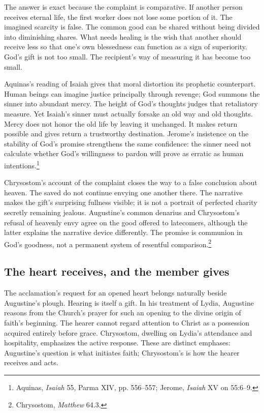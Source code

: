 The answer is exact because the complaint is comparative. If another person receives eternal life, the first worker does not lose some portion of it. The imagined scarcity is false. The common good can be shared without being divided into diminishing shares. What needs healing is the wish that another should receive less so that one's own blessedness can function as a sign of superiority. God's gift is not too small. The recipient's way of measuring it has become too small.

Aquinas's reading of Isaiah gives that moral distortion its prophetic counterpart. Human beings can imagine justice principally through revenge; God summons the sinner into abundant mercy. The height of God's thoughts judges that retaliatory measure. Yet Isaiah's sinner must actually forsake an old way and old thoughts. Mercy does not honor the old life by leaving it unchanged. It makes return possible and gives return a trustworthy destination. Jerome's insistence on the stability of God's promise strengthens the same confidence: the sinner need not calculate whether God's willingness to pardon will prove as erratic as human intentions.\footnote{Aquinas, \textit{Isaiah} 55, Parma XIV, pp. 556--557; Jerome, \textit{Isaiah} XV on 55:6--9.}

Chrysostom's account of the complaint closes the way to a false conclusion about heaven. The saved do not continue envying one another there. The narrative makes the gift's surprising fullness visible; it is not a portrait of perfected charity secretly remaining jealous. Augustine's common denarius and Chrysostom's refusal of heavenly envy agree on the good offered to latecomers, although the latter explains the narrative device differently. The promise is communion in God's goodness, not a permanent system of resentful comparison.\footnote{Chrysostom, \textit{Matthew} 64.3.}

\subsection{The heart receives, and the member gives}
The acclamation's request for an opened heart belongs naturally beside Augustine's plough. Hearing is itself a gift. In his treatment of Lydia, Augustine reasons from the Church's prayer for such an opening to the divine origin of faith's beginning. The hearer cannot regard attention to Christ as a possession acquired entirely before grace. Chrysostom, dwelling on Lydia's attendance and hospitality, emphasizes the active response. These are distinct emphases: Augustine's question is what initiates faith; Chrysostom's is how the hearer receives and acts.

